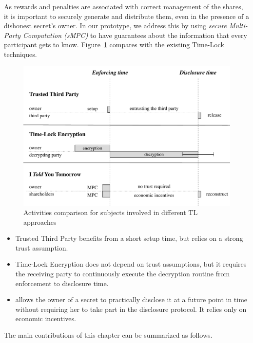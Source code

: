 As rewards and penalties are associated with correct management of the shares, it is important to securely generate and distribute them, even in the presence of a dishonest secret's owner.
In our prototype, we address this by using {\em secure Multi-Party Computation (sMPC)} to have guarantees about the information that every participant gets to know.
%
Figure~\ref{fig:models} compares \shortname with the existing Time-Lock techniques.

\begin{figure}[t]
	\centering
	\includegraphics[width=1.0\textwidth]{fig/models}
	\caption{Activities comparison for subjects involved in different TL approaches}
	\label{fig:models}
\end{figure}


\begin{itemize}
	\item Trusted Third Party benefits from a short setup time,
          but relies on a strong trust assumption.
	
	\item Time-Lock Encryption does not depend on trust assumptions, but it requires the receiving party to continuously execute the decryption routine from enforcement to disclosure time.
	
	\item {\em \name} allows the owner of a secret to practically disclose it at a future point in time without requiring her to take part in the disclosure protocol. It relies only on economic incentives.
\end{itemize}

\noindent The main contributions of this chapter can be summarized as follows.

